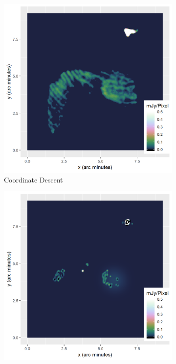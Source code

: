 \newpage

\begin{figure}[h]
	\centering
	\begin{subfigure}[b]{0.3\linewidth}
		\includegraphics[width=1.00\linewidth]{./chapters/10.results/SerialCD/CD-Calibration.png}
		\caption{Coordinate Descent}
	\end{subfigure}
	\begin{subfigure}[b]{0.3\linewidth}
		\includegraphics[width=1.00\linewidth]{./chapters/10.results/iuwt/iuwt-Calibration.png}

\end{subfigure}
\end{figure}
